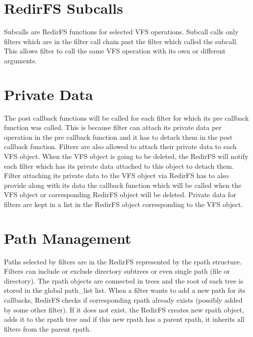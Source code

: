 \documentclass[oneside, 11pt, a4]{article}
\begin{document}
\section{RedirFS Subcalls}
Subcalls are RedirFS functions for selected VFS operations. Subcall calls only
filters which are in the filter call chain past the filter which called the
subcall. This allows filter to call the same VFS operation with its own or
different arguments.

\section{Private Data}
The post callback functions will be called for each filter for which its pre
callback function was called. This is because filter can attach its private data
per operation in the pre callback function and it has to detach them in the post
callback function. Filters are also allowed to attach their private data to each
VFS object. When the VFS object is going to be deleted, the RedirFS will notify
each filter which has its private data attached to this object to detach them.
Filter attaching its private data to the VFS object via RedirFS has to also
provide along with its data the callback function which will be called when the
VFS object or corresponding RedirFS object will be deleted. Private data for
filters are kept in a list in the RedirFS object corresponding to the VFS
object.

\section{Path Management}
Paths selected by filters are in the RedirFS represented by the rpath structure.
Filters can include or exclude directory subtrees or even single path (file or
directory). The rpath objects are connected in trees and the root of each tree
is stored in the global path\_list list. When a filter wants to add a new path
for its callbacks, RedirFS checks if corresponding rpath already exists
(possibly added by some other filter). If it does not exist, the RedirFS creates
new rpath object, adds it to the rpath tree and if this new rpath has a parent
rpath, it inherits all filters from the parent rpath.
\end{document}
